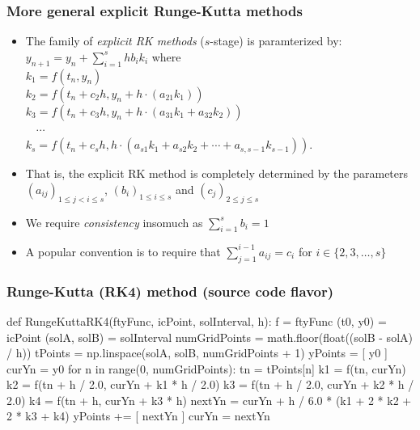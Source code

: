 \documentclass[usenames,svgnames,dvipsnames,10pt]{beamer}
\begin{document}
\begin{frame}
\frametitle{More general explicit Runge-Kutta methods}

\begin{itemize} 

\item The family of \emph{explicit RK methods} ($s$-stage) is paramterized by: \\ 
      $y_{n+1} = y_n + \sum\limits_{i=1}^{s} hb_ik_i$ where \\ 
      $k_1 = f(t_n, y_n)$ \\ 
      $k_2 = f(t_n + c_2h, y_n +h \cdot (a_{21}k_1))$ \\ 
      $k_3 = f(t_n + c_3h, y_n + h \cdot (a_{31}k_1 + a_{32}k_2))$ \\ 
      $\phantom{k_4}\cdots$ \\ 
      $k_s = f(t_n + c_sh, h \cdot(a_{s1}k_1 + a_{s2}k_2 + \cdots + a_{s,s-1}k_{s-1}))$. 
\item That is, the explicit RK method is completely determined by the parameters 
      $(a_{ij})_{1 \leq j < i \leq s}$, $(b_i)_{1 \leq i \leq s}$ and $(c_j)_{2 \leq j \leq s}$
\item We require \emph{consistency} insomuch as $\sum\limits_{i=1}^s b_i = 1$ 
\item A popular convention is to require that $\sum\limits_{j=1}^{i-1} a_{ij} = c_i$ for $i \in \{2,3,\ldots,s\}$ 

\end{itemize} 

\end{frame}
\begin{frame}[fragile]
\frametitle{Runge-Kutta (RK4) method (source code flavor)}

\begin{center}
\begin{pythoncode}
def RungeKuttaRK4(ftyFunc, icPoint, solInterval, h):
    f = ftyFunc
    (t0, y0) = icPoint
    (solA, solB) = solInterval
    numGridPoints = math.floor(float((solB - solA) / h))
    tPoints = np.linspace(solA, solB, numGridPoints + 1)
    yPoints = [ y0 ]
    curYn = y0
    for n in range(0, numGridPoints):
        tn = tPoints[n]
        k1 = f(tn, curYn)
        k2 = f(tn + h / 2.0, curYn + k1 * h / 2.0)
        k3 = f(tn + h / 2.0, curYn + k2 * h / 2.0)
        k4 = f(tn + h, curYn + k3 * h)
        nextYn = curYn + h / 6.0 * (k1 + 2 * k2 + 2 * k3 + k4)
        yPoints += [ nextYn ]
        curYn = nextYn
\end{pythoncode}
\end{center}

\end{frame}
\end{document}
